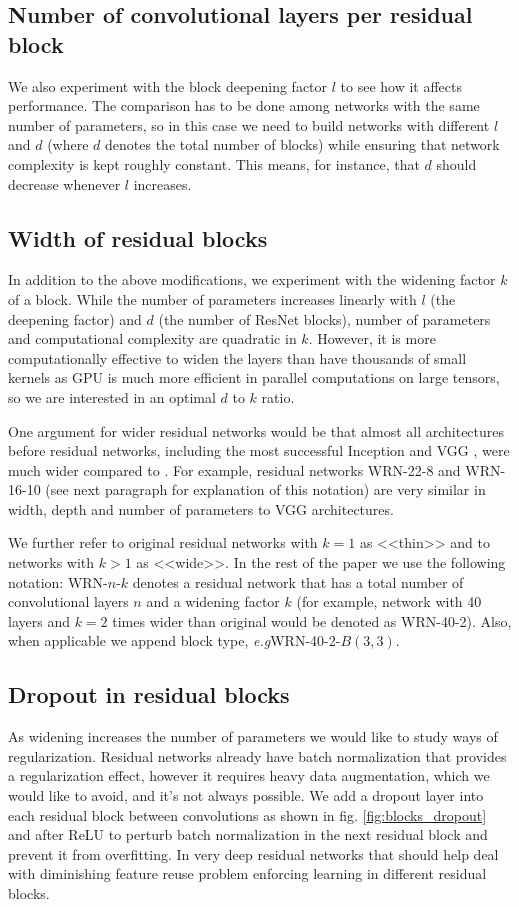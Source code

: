 \documentclass{bmvc2k}
\def\eg{\emph{e.g}\bmvaOneDot}
\begin{document}
\subsection{Number of convolutional layers per residual block}
We also experiment with the block deepening factor $l$ to see how it affects performance.
The comparison has to be done among  networks with the same number of parameters, so in this case we need to build  networks with different $l$ and $d$ (where $d$ denotes the total number of blocks) while ensuring that  network complexity is kept roughly constant. This means, for instance, that $d$ should decrease whenever  $l$ increases.

\subsection{Width of residual blocks} In addition to the above modifications, we experiment with the widening factor $k$ of a block.
While the number of parameters increases linearly with $l$ (the deepening factor) and $d$ (the number of ResNet blocks), number of parameters and computational complexity are quadratic in $k$. However, it is more computationally effective to widen the layers than have thousands of small kernels as GPU is much more efficient in parallel computations on large tensors, so we are interested in an optimal $d$ to $k$ ratio.

One argument for wider residual networks would be that almost all architectures before residual networks, including the most successful Inception \cite{GoogLeNet} and VGG \cite{Simonyan15}, were much wider compared to \cite{basicblock2}. For example, residual networks WRN-22-8 and WRN-16-10 (see next paragraph for explanation of this notation) are very similar in width, depth and number of parameters to VGG architectures.

We further refer to original residual networks with $k=1$ as <<thin>> and to networks with $k>1$ as <<wide>>. In the rest of the paper we use the following notation: WRN-$n$-$k$  denotes a residual network that has a total number of convolutional layers $n$ and a widening factor $k$ (for example, network with 40 layers and $k=2$ times wider than original would be denoted as WRN-40-2). Also, when applicable we append block type, \eg WRN-40-2-$B(3,3)$.

\subsection{Dropout in residual blocks} As widening increases the number of parameters we would like to study ways of regularization. Residual networks already have batch normalization that provides a regularization effect, however it requires heavy data augmentation, which we would like to avoid, and it's not always possible. We add a dropout layer into each residual block between convolutions as shown in fig. \ref{fig:blocks_dropout} and after ReLU to perturb batch normalization in the next residual block and prevent it from overfitting. In very deep residual networks that should help deal with diminishing feature reuse problem enforcing learning in different residual blocks.
\end{document}
